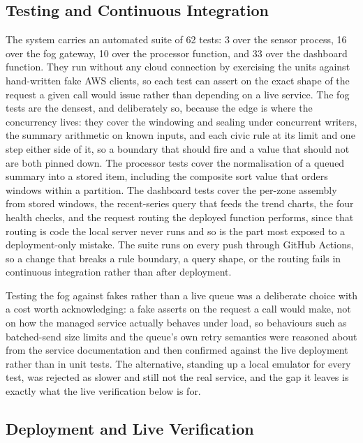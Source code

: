 \documentclass[conference]{IEEEtran}
\begin{document}
\subsection{Testing and Continuous Integration}

The system carries an automated suite of 62 tests: 3 over the sensor process, 16 over the fog gateway, 10 over the processor function, and 33 over the dashboard function. They run without any cloud connection by exercising the units against hand-written fake AWS clients, so each test can assert on the exact shape of the request a given call would issue rather than depending on a live service. The fog tests are the densest, and deliberately so, because the edge is where the concurrency lives: they cover the windowing and sealing under concurrent writers, the summary arithmetic on known inputs, and each civic rule at its limit and one step either side of it, so a boundary that should fire and a value that should not are both pinned down. The processor tests cover the normalisation of a queued summary into a stored item, including the composite sort value that orders windows within a partition. The dashboard tests cover the per-zone assembly from stored windows, the recent-series query that feeds the trend charts, the four health checks, and the request routing the deployed function performs, since that routing is code the local server never runs and so is the part most exposed to a deployment-only mistake. The suite runs on every push through GitHub Actions, so a change that breaks a rule boundary, a query shape, or the routing fails in continuous integration rather than after deployment.

Testing the fog against fakes rather than a live queue was a deliberate choice with a cost worth acknowledging: a fake asserts on the request a call would make, not on how the managed service actually behaves under load, so behaviours such as batched-send size limits and the queue's own retry semantics were reasoned about from the service documentation and then confirmed against the live deployment rather than in unit tests. The alternative, standing up a local emulator for every test, was rejected as slower and still not the real service, and the gap it leaves is exactly what the live verification below is for.

\subsection{Deployment and Live Verification}
\end{document}

